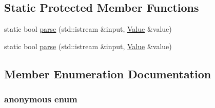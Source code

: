 \subsection*{Static Protected Member Functions}
\begin{DoxyCompactItemize}
\item 
static bool \hyperlink{classjsonxx_1_1_value_a02ef22c35e4899b659642c3cb64ac1f0}{parse} (std\+::istream \&input, \hyperlink{classjsonxx_1_1_value}{Value} \&value)
\item 
static bool \hyperlink{classjsonxx_1_1_value_a8420f1c17c17cba86be4602896567a09}{parse} (std\+::istream \&input, \hyperlink{classjsonxx_1_1_value}{Value} \&value)
\end{DoxyCompactItemize}


\subsection{Member Enumeration Documentation}
\hypertarget{classjsonxx_1_1_value_ac5f36bd6c5d21d68538b948d71f9598b}{}\subsubsection[{anonymous enum}]{\setlength{\rightskip}{0pt plus 5cm}anonymous enum}\label{classjsonxx_1_1_value_ac5f36bd6c5d21d68538b948d71f9598b}
